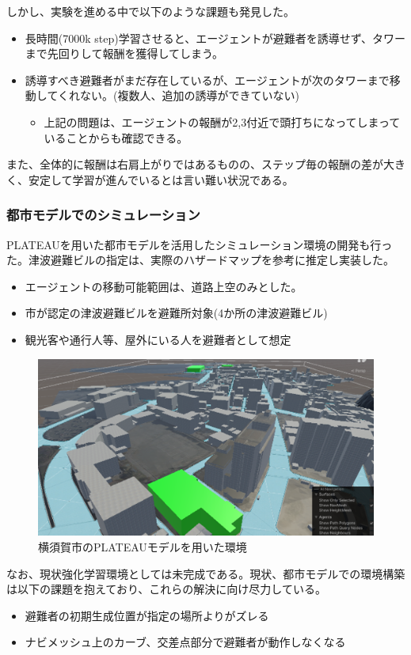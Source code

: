 \documentclass{article}[jsarticle]
\begin{document}
しかし、実験を進める中で以下のような課題も発見した。
\begin{itemize}
    \item 長時間(7000k step)学習させると、エージェントが避難者を誘導せず、タワーまで先回りして報酬を獲得してしまう。
    \item 誘導すべき避難者がまだ存在しているが、エージェントが次のタワーまで移動してくれない。(複数人、追加の誘導ができていない)
    \begin{itemize}
        \item 上記の問題は、エージェントの報酬が2,3付近で頭打ちになってしまっていることからも確認できる。
    \end{itemize}
\end{itemize}
また、全体的に報酬は右肩上がりではあるものの、ステップ毎の報酬の差が大きく、安定して学習が進んでいるとは言い難い状況である。

\subsubsection{都市モデルでのシミュレーション}
PLATEAUを用いた都市モデルを活用したシミュレーション環境の開発も行った。津波避難ビルの指定は、実際のハザードマップを参考に推定し実装した。
\begin{itemize}
    \item エージェントの移動可能範囲は、道路上空のみとした。
    \item 市が認定の津波避難ビルを避難所対象(4か所の津波避難ビル)
    \item 観光客や通行人等、屋外にいる人を避難者として想定
\end{itemize}
\begin{figure}[H]
    \centering
    \includegraphics[scale=0.8]{./images/PLATEAU-demo.png}
    \caption{
       横須賀市のPLATEAUモデルを用いた環境
    }
\end{figure}
なお、現状強化学習環境としては未完成である。現状、都市モデルでの環境構築は以下の課題を抱えており、これらの解決に向け尽力している。
\begin{itemize}
    \item 避難者の初期生成位置が指定の場所よりがズレる
    \item ナビメッシュ上のカーブ、交差点部分で避難者が動作しなくなる
\end{itemize}
\end{document}
